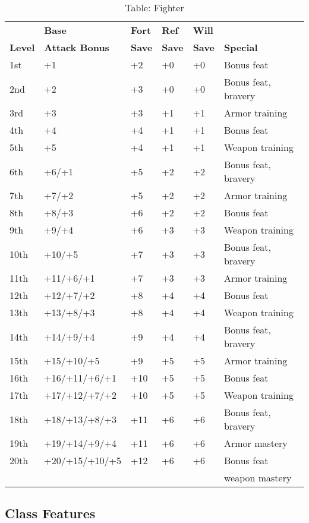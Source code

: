 \begin{table}[]
\sffamily
\setlength{\tabcolsep}{1pt}
\caption{Table: Fighter}
\begin{tabular}{llllll}
               & \textbf{Base} & \textbf{Fort} & \textbf{Ref} & \textbf{Will}\\
\textbf{Level} & \textbf{Attack Bonus} & \textbf{Save} & \textbf{Save} & \textbf{Save} & \textbf{Special}\\
1st & +1 & +2 & +0 & +0 & Bonus feat\\
2nd & +2 & +3 & +0 & +0 & Bonus feat, bravery\\
3rd & +3 & +3 & +1 & +1 & Armor training\\
4th & +4 & +4 & +1 & +1 & Bonus feat\\
5th & +5 & +4 & +1 & +1 & Weapon training\\
6th & +6/+1 & +5 & +2 & +2 & Bonus feat, bravery\\
7th & +7/+2 & +5 & +2 & +2 & Armor training\\
8th & +8/+3 & +6 & +2 & +2 & Bonus feat\\
9th & +9/+4 & +6 & +3 & +3 & Weapon training\\
10th & +10/+5 & +7 & +3 & +3 & Bonus feat, bravery\\
11th & +11/+6/+1 & +7 & +3 & +3 & Armor training\\
12th & +12/+7/+2 & +8 & +4 & +4 & Bonus feat\\
13th & +13/+8/+3 & +8 & +4 & +4 & Weapon training\\
14th & +14/+9/+4 & +9 & +4 & +4 & Bonus feat, bravery\\
15th & +15/+10/+5 & +9 & +5 & +5 & Armor training\\
16th & +16/+11/+6/+1 & +10 & +5 & +5 & Bonus feat\\
17th & +17/+12/+7/+2 & +10 & +5 & +5 & Weapon training\\
18th & +18/+13/+8/+3 & +11 & +6 & +6 & Bonus feat, bravery\\
19th & +19/+14/+9/+4 & +11 & +6 & +6 & Armor mastery\\
20th & +20/+15/+10/+5 & +12 & +6 & +6 & Bonus feat \\
     &                &     &    &    & weapon mastery\\
\end{tabular}
\end{table}
				
\subsection{Class Features}

